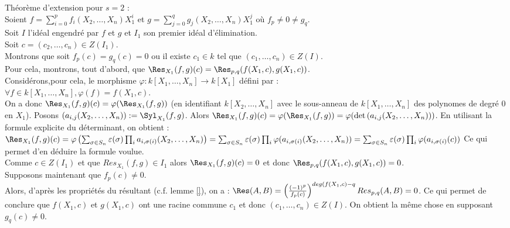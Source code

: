 Théorème d'extension pour $s=2$ : \\
Soient $f=\sum_{i=0}^p f_i(X_2,\ldots,X_n)X_1^i$ et $g=\sum_{j=0}^q g_j(X_2,\ldots,X_n)X_1^j$ où $f_p \neq 0 \neq g_q$. \\
Soit $I$ l'idéal engendré par $f$ et $g$ et $I_1$ son premier idéal d'élimination.\\
Soit $c=(c_2,\ldots,c_n) \in Z(I_1)$.\\
Montrons que soit $f_p(c)=g_q(c)=0$ ou il existe $c_1 \in k$ tel que $(c_1,\ldots,c_n) \in Z(I)$.\\

Pour cela, montrons, tout d'abord, que $\Res_{X_1}(f,g)(c)=\Res_{p,q}(f(X_1,c),g(X_1,c))$.\\
Considérons,pour cela, le morphisme $\varphi : k[X_1,\ldots,X_n]\to k[X_1]$ défini par : \\
$\forall f \in k[X_1,\ldots,X_n],\varphi(f)=f(X_1,c)$.\\
On a donc $\Res_{X_1}(f,g)(c)=\varphi(\Res_{X_1}(f,g))$ (en identifiant $k[X_2,\ldots,X_n]$ avec le sous-anneau de $k[X_1,\ldots,X_n]$ des polynomes de degré 0 en $X_1$).
Posons $\left(a_{i,j}(X_2,\ldots,X_n)\right):=\Syl_{X_1}(f,g)$.
Alors $\Res_{X_1}(f,g)(c)=\varphi(\Res_{X_1}(f,g))=\varphi(\det\left(a_{i,j}(X_2,\ldots,X_n)\right))$.
En utilisant la formule explicite du déterminant, on obtient : 
$\Res_{X_1}(f,g)(c)=\varphi\left(\sum_{\sigma \in S_n } \varepsilon(\sigma) \prod_i a_{i,\sigma(i)}(X_2,\ldots,X_n)\right)=\sum_{\sigma \in S_n } \varepsilon(\sigma) \prod_i \varphi(a_{i,\sigma(i)}(X_2,\ldots,X_n))=\sum_{\sigma \in S_n } \varepsilon(\sigma) \prod_i \varphi(a_{i,\sigma(i)}(c))$
Ce qui permet d'en déduire la formule voulue.\\

Comme $c \in Z(I_1)$ et que $Res_{X_1}(f,g) \in I_1$ alors $\Res_{X_1}(f,g)(c)=0$ et donc $\Res_{p,q}(f(X_1,c),g(X_1,c))=0$.\\
Supposons maintenant que $f_p(c) \neq 0$. \\
Alors, d'après les propriétés du résultant (c.f. lemme \ref{}), on a : $\Res(A,B)=\left(\frac{(-1)^p}{f_p(c)}\right)^{deg(f(X_1,c)-q}Res_{p,q}(A,B)=0$.
Ce qui permet de conclure que $f(X_1,c)$ et $g(X_1,c)$ ont une racine commune $c_1$ et donc $(c_1,\ldots,c_n) \in Z(I)$.
On obtient la m\^eme chose en supposant $g_q(c) \neq 0$.



